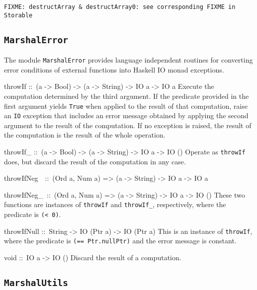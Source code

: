 \documentclass[a4paper,twosides]{article}
\makeatletter
\newcommand{\code}[1]{\texttt{#1}}      %
\newenvironment{codedesc}{%
  \list{}{\labelwidth\z@
    \let\makelabel\codedesclabel}
  }{%
  \endlist
  }
\newcommand*{\codedesclabel}[1]{%
  \hspace{-\leftmargin}
  \parbox[b]{\labelwidth}{\makebox[0pt][l]{\code{#1}}\\}\hfil\relax
  }
\newcommand{\combineitems}{\vspace*{-\itemsep}\vspace*{-\parsep}\vspace*{-1em}}
\makeatother
\begin{document}
\begin{verbatim}
FIXME: destructArray & destructArray0: see corresponding FIXME in Storable
\end{verbatim}

\subsection{\code{MarshalError}}
\label{sec:MarshalError}

The module \code{MarshalError} provides language independent routines for
converting error conditions of external functions into Haskell IO monad
exceptions.
%
\begin{codedesc}
\item[throwIf ::\ (a -> Bool) -> (a -> String) -> IO a -> IO a] Execute the
  computation determined by the third argument.  If the predicate provided in
  the first argument yields \code{True} when applied to the result of that
  computation, raise an \code{IO} exception that includes an error message
  obtained by applying the second argument to the result of the computation.
  If no exception is raised, the result of the computation is the result of
  the whole operation.

\item[throwIf\_ ::\ (a -> Bool) -> (a -> String) -> IO a -> IO ()]
  Operate as \code{throwIf} does, but discard the result of the computation
  in any case.

\item[throwIfNeg~~::\ (Ord a, Num a) => (a -> String) -> IO a -> IO a]
\item[throwIfNeg\_~::\ (Ord a, Num a) => (a -> String) -> IO a -> IO ()]\combineitems
  These two functions are instances of \code{throwIf} and \code{throwIf\_},
  respectively, where the predicate is \code{(< 0)}.
  
\item[throwIfNull ::\ String -> IO (Ptr a) -> IO (Ptr a)] This is an instance
  of \code{throwIf}, where the predicate is \code{(== Ptr.nullPtr)} and the
  error message is constant.

\item[void ::\ IO a -> IO ()]
  Discard the result of a computation.
\end{codedesc}

\subsection{\code{MarshalUtils}}
\label{sec:MarshalUtils}
\end{document}
